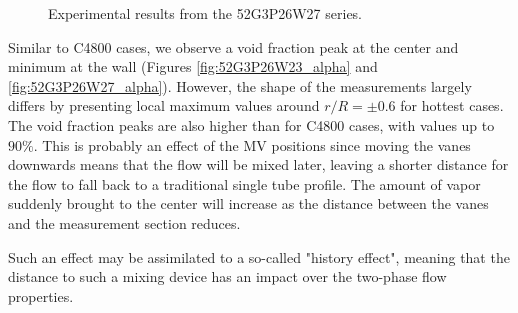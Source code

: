 \begin{figure}[!h]
\centering
{}

\caption{Experimental results from the 52G3P26W27 series.}
\label{fig:exp_52G3P26W27}
\end{figure}

\npar

Similar to C4800 cases, we observe a void fraction peak at the center and minimum at the wall (Figures \ref{fig:52G3P26W23_alpha} and \ref{fig:52G3P26W27_alpha}). However, the shape of the measurements largely differs by presenting local maximum values around $r/R = \pm 0.6$ for hottest cases. The void fraction peaks are also higher than for C4800 cases, with values up to $90\%$. This is probably an effect of the MV positions since moving the vanes downwards means that the flow will be mixed later, leaving a shorter distance for the flow to fall back to a traditional single tube profile. The amount of vapor suddenly brought to the center will increase as the distance between the vanes and the measurement section reduces.

\begin{remark*}{}
Such an effect may be assimilated to a so-called "history effect", meaning that the distance to such a mixing device has an impact over the two-phase flow properties.
\end{remark*}

